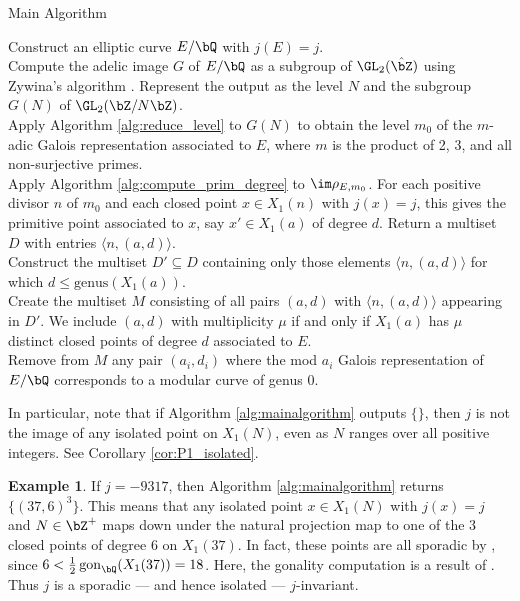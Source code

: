 \documentclass[11pt,reqno]{amsart}
\theoremstyle{plain}
\theoremstyle{definition}
\newtheorem{example}[theorem]{Example}
\DeclareMathOperator{\gon}{gon}
\newcommand{\Q}{\bQ}
\newcommand{\Z}{\bZ}
\begin{document}
\setcounter{algocf}{0}
\begin{algorithm}[h!]
\caption{Main Algorithm}\label{alg:mainalgorithm}
\KwIn{A non-CM $j$-invariant $j \in \Q$.}
Construct an elliptic curve $E/\Q$ with $j(E)=j$.\\
Compute the adelic image $G$ of $E/\Q$ as a subgroup of $\GL_2(\hat{\Z})$ using Zywina's algorithm \cite{ZywinaAlgorithm}. Represent the output as the level $N$ and the subgroup $G(N)$ of $\GL_2(\Z/N\Z)$.\\
Apply Algorithm \ref{alg:reduce_level} to $G(N)$ to obtain the level $m_0$ of the $m$-adic Galois representation associated to $E$, where $m$ is the product of 2, 3, and all non-surjective primes.\\
Apply Algorithm \ref{alg:compute_prim_degree} to $\im \rho_{E,m_0}$. For each positive divisor $n$ of $m_0$ and each closed point $x \in X_1(n)$ with $j(x)=j$, this gives the primitive point associated to $x$, say $x' \in X_1(a)$ of degree $d$. Return a multiset $D$ with entries $\langle n, (a, d) \rangle$.\\
Construct the multiset $D' \subseteq D$ containing only those elements $\langle n, (a, d)\rangle$ for which $d\leq \text{genus}(X_1(a))$.\\
Create the multiset $M$ consisting of all pairs $(a,d)$ with $\langle n, (a,d) \rangle$ appearing in $D'$. We include $(a,d) $ with multiplicity $\mu$ if and only if $X_1(a)$ has $\mu$ distinct closed points of degree $d$ associated to $E$.\\
Remove from $M$ any pair $(a_i,d_i)$ where the mod $a_i$ Galois representation of $E/\Q$ corresponds to a modular curve of genus 0.\\

\end{algorithm}

In particular, note that if Algorithm \ref{alg:mainalgorithm} outputs $\{\}$, then $j$ is not the image of any isolated point on $X_1(N)$, even as $N$ ranges over all positive integers. See Corollary \ref{cor:P1_isolated}.

\begin{example}
If $j=-9317$, then Algorithm \ref{alg:mainalgorithm} returns $ \{(37,6) ^3\}$. This means that any isolated point $x\in X_1(N)$ with $j(x)=j$ and $N \in \Z^+$ maps down under the natural projection map to one of the 3 closed points of degree 6 on $X_1(37)$. In fact, these points are all sporadic by \cite[Proposition 2]{frey}, since $6 < \frac{1}{2} \gon_{\Q}(X_1(37)) = 18$. Here, the gonality computation is a result of \cite{DerickxVanHoeij2014}. Thus $j$ is a sporadic --- and hence isolated --- $j$-invariant.
\end{example}
\end{document}
